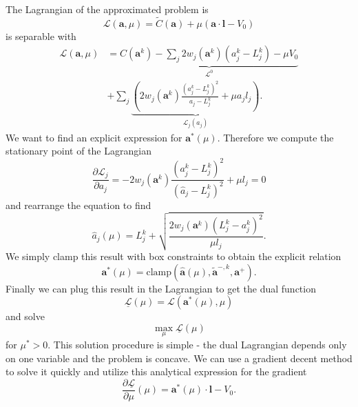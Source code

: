 The Lagrangian of the approximated problem is
\begin{equation}
    \mathcal{L}(\mathbf{a}, \mu) = \tilde{C}(\mathbf{a}) + \mu \left( \mathbf{a} \cdot \mathbf{l} - V_0 \right)
\end{equation}
is separable with 
\begin{equation}
    \begin{split}
        \mathcal{L}(\mathbf{a}, \mu) &= \underbrace{C(\mathbf{a}^k) - \sum_j 2w_j (\mathbf{a}^k) (a^k_j-L^k_j) - \mu V_0}_{\mathcal{L}^0} \\
        &+ \sum_j \underbrace{\left(2 w_j (\mathbf{a}^k)
        \frac{(a^k_j-L^k_j)^2}{a_j-L^k_j} + \mu a_j l_j \right)}_{\mathcal{L}_j (a_j)}.
    \end{split}
\end{equation}
We want to find an explicit expression for $\mathbf{a}^*(\mu)$. Therefore we compute the stationary point of the Lagrangian
\begin{equation}
    \frac{\partial \mathcal{L}_j}{\partial a_j} = -2 w_j (\mathbf{a}^k)
    \frac{(a^k_j-L^k_j)^2}{(\hat{a}_j-L^k_j)^2} + \mu l_j = 0
\end{equation}
and rearrange the equation to find 
\begin{equation}
    \hat{a}_j(\mu) = L_j^k + \sqrt{\frac{2 w_j (\mathbf{a}^k)
    (L^k_j-a^k_j)^2}{\mu l_j}}. 
\end{equation}
We simply clamp this result with box constraints to obtain the explicit relation 
\begin{equation}
    \mathbf{a}^* (\mu) = \textrm{clamp}\left(\hat{\mathbf{a}}(\mu), \tilde{\mathbf{a}}^{-,k}, \mathbf{a}^+\right). 
\end{equation}
Finally we can plug this result in the Lagrangian to get the dual function
\begin{equation}
    \underline{\mathcal{L}}(\mu) = \mathcal{L}(\mathbf{a}^* (\mu), \mu)
\end{equation}
and solve 
\begin{equation}
    \max_{\mu} \underline{\mathcal{L}}(\mu)
\end{equation}
for $\mu^*>0$. This solution procedure is simple - the dual Lagrangian depends only on one variable and the problem is concave. We can use a gradient decent method to solve it quickly and utilize this analytical expression for the gradient 
\begin{equation}
    \frac{\partial \underline{\mathcal{L}}}{\partial \mu}(\mu) =  \mathbf{a}^* (\mu) \cdot \mathbf{l} - V_0.
\end{equation}


